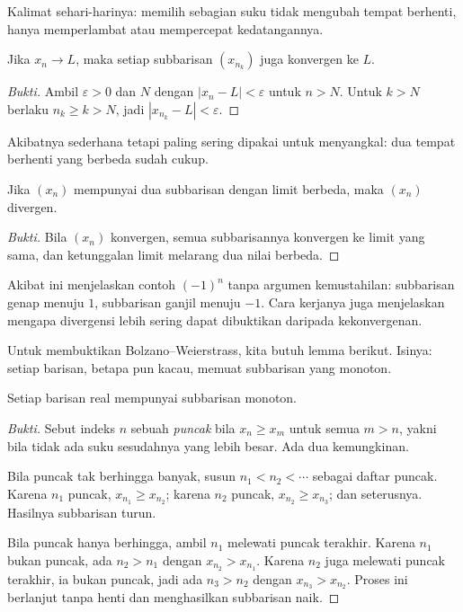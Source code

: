 Kalimat sehari-harinya: memilih sebagian suku tidak mengubah tempat berhenti, hanya
memperlambat atau mempercepat kedatangannya.

\begin{proposisi}
Jika $x_n \to L$, maka setiap subbarisan $(x_{n_k})$ juga konvergen ke $L$.
\end{proposisi}

\begin{proof}[Bukti]
Ambil $\varepsilon>0$ dan $N$ dengan $|x_n-L|<\varepsilon$ untuk $n>N$. Untuk
$k>N$ berlaku $n_k \ge k>N$, jadi $|x_{n_k}-L|<\varepsilon$.
\end{proof}

Akibatnya sederhana tetapi paling sering dipakai untuk menyangkal: dua tempat
berhenti yang berbeda sudah cukup.

\begin{akibat}
Jika $(x_n)$ mempunyai dua subbarisan dengan limit berbeda, maka $(x_n)$ divergen.
\end{akibat}

\begin{proof}[Bukti]
Bila $(x_n)$ konvergen, semua subbarisannya konvergen ke limit yang sama, dan
ketunggalan limit melarang dua nilai berbeda.
\end{proof}

Akibat ini menjelaskan contoh $(-1)^n$ tanpa argumen kemustahilan: subbarisan
genap menuju $1$, subbarisan ganjil menuju $-1$. Cara kerjanya juga menjelaskan
mengapa divergensi lebih sering dapat dibuktikan daripada kekonvergenan.

Untuk membuktikan Bolzano--Weierstrass, kita butuh lemma berikut. Isinya: setiap
barisan, betapa pun kacau, memuat subbarisan yang monoton.

\begin{lemma}
Setiap barisan real mempunyai subbarisan monoton.
\end{lemma}

\begin{proof}[Bukti]
Sebut indeks $n$ sebuah \emph{puncak} bila $x_n \ge x_m$ untuk semua $m>n$, yakni
bila tidak ada suku sesudahnya yang lebih besar. Ada dua kemungkinan.

Bila puncak tak berhingga banyak, susun $n_1<n_2<\cdots$ sebagai daftar puncak.
Karena $n_1$ puncak, $x_{n_1} \ge x_{n_2}$; karena $n_2$ puncak,
$x_{n_2} \ge x_{n_3}$; dan seterusnya. Hasilnya subbarisan turun.

Bila puncak hanya berhingga, ambil $n_1$ melewati puncak terakhir. Karena $n_1$
bukan puncak, ada $n_2>n_1$ dengan $x_{n_2}>x_{n_1}$. Karena $n_2$ juga melewati
puncak terakhir, ia bukan puncak, jadi ada $n_3>n_2$ dengan $x_{n_3}>x_{n_2}$.
Proses ini berlanjut tanpa henti dan menghasilkan subbarisan naik.
\end{proof}

